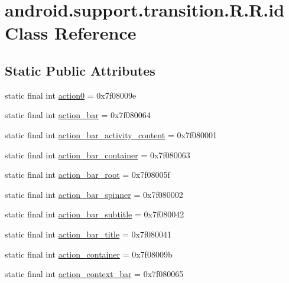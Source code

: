\hypertarget{classandroid_1_1support_1_1transition_1_1_r_1_1id}{
\section{android.support.transition.R.R.id Class Reference}
\label{classandroid_1_1support_1_1transition_1_1_r_1_1id}
}
\subsection*{Static Public Attributes}
\begin{CompactItemize}
\item 
static final int \hyperlink{classandroid_1_1support_1_1transition_1_1_r_1_1id_394c7da842831d7c64a1180403c27bb2}{action0} = 0x7f08009e
\item 
static final int \hyperlink{classandroid_1_1support_1_1transition_1_1_r_1_1id_0bd85da67315b7145445d118da172c83}{action\_\-bar} = 0x7f080064
\item 
static final int \hyperlink{classandroid_1_1support_1_1transition_1_1_r_1_1id_a16c91cd164fdfb89785da279ff8374d}{action\_\-bar\_\-activity\_\-content} = 0x7f080001
\item 
static final int \hyperlink{classandroid_1_1support_1_1transition_1_1_r_1_1id_31acd9219df2c744873feabd8ce07d53}{action\_\-bar\_\-container} = 0x7f080063
\item 
static final int \hyperlink{classandroid_1_1support_1_1transition_1_1_r_1_1id_03af219d939f86b10cd772be42fc0b16}{action\_\-bar\_\-root} = 0x7f08005f
\item 
static final int \hyperlink{classandroid_1_1support_1_1transition_1_1_r_1_1id_71e46b00b606b1456c3363e051795d73}{action\_\-bar\_\-spinner} = 0x7f080002
\item 
static final int \hyperlink{classandroid_1_1support_1_1transition_1_1_r_1_1id_cc74fa1534825b97a679d492a96f83b5}{action\_\-bar\_\-subtitle} = 0x7f080042
\item 
static final int \hyperlink{classandroid_1_1support_1_1transition_1_1_r_1_1id_67252b100132474b74e8e294e7d9f6ef}{action\_\-bar\_\-title} = 0x7f080041
\item 
static final int \hyperlink{classandroid_1_1support_1_1transition_1_1_r_1_1id_efb2c4a79b06ca84e0f850920a80d9fa}{action\_\-container} = 0x7f08009b
\item 
static final int \hyperlink{classandroid_1_1support_1_1transition_1_1_r_1_1id_c3220b76d6fa6d21cf6b3d7f73eece74}{action\_\-context\_\-bar} = 0x7f080065

\end{CompactItemize}
